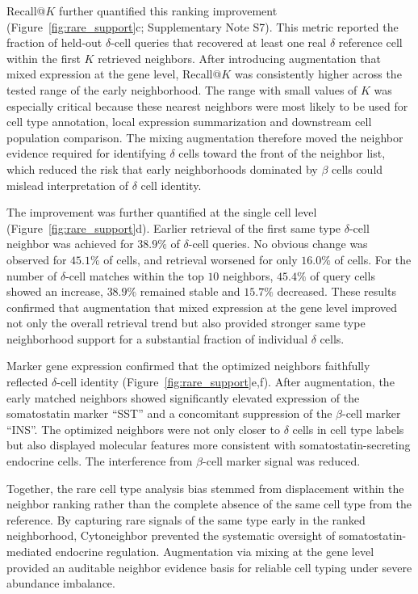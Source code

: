 \documentclass[11pt]{article}
\begin{document}
Recall@$K$ further quantified this ranking improvement (Figure~\ref{fig:rare_support}c; Supplementary Note S7). This metric reported the fraction of held-out $\delta$-cell queries that recovered at least one real $\delta$ reference cell within the first $K$ retrieved neighbors. After introducing augmentation that mixed expression at the gene level, Recall@$K$ was consistently higher across the tested range of the early neighborhood. The range with small values of $K$ was especially critical because these nearest neighbors were most likely to be used for cell type annotation, local expression summarization and downstream cell population comparison. The mixing augmentation therefore moved the neighbor evidence required for identifying $\delta$ cells toward the front of the neighbor list, which reduced the risk that early neighborhoods dominated by $\beta$ cells could mislead interpretation of $\delta$ cell identity.

The improvement was further quantified at the single cell level (Figure~\ref{fig:rare_support}d). Earlier retrieval of the first same type $\delta$-cell neighbor was achieved for $38.9\%$ of $\delta$-cell queries. No obvious change was observed for $45.1\%$ of cells, and retrieval worsened for only $16.0\%$ of cells. For the number of $\delta$-cell matches within the top $10$ neighbors, $45.4\%$ of query cells showed an increase, $38.9\%$ remained stable and $15.7\%$ decreased. These results confirmed that augmentation that mixed expression at the gene level improved not only the overall retrieval trend but also provided stronger same type neighborhood support for a substantial fraction of individual $\delta$ cells.

Marker gene expression confirmed that the optimized neighbors faithfully reflected $\delta$-cell identity (Figure~\ref{fig:rare_support}e,f). After augmentation, the early matched neighbors showed significantly elevated expression of the somatostatin marker ``SST'' and a concomitant suppression of the $\beta$-cell marker ``INS''. The optimized neighbors were not only closer to $\delta$ cells in cell type labels but also displayed molecular features more consistent with somatostatin-secreting endocrine cells. The interference from $\beta$-cell marker signal was reduced.

Together, the rare cell type analysis bias stemmed from displacement within the neighbor ranking rather than the complete absence of the same cell type from the reference. By capturing rare signals of the same type early in the ranked neighborhood, Cytoneighbor prevented the systematic oversight of somatostatin-mediated endocrine regulation. Augmentation via mixing at the gene level provided an auditable neighbor evidence basis for reliable cell typing under severe abundance imbalance.
\end{document}
